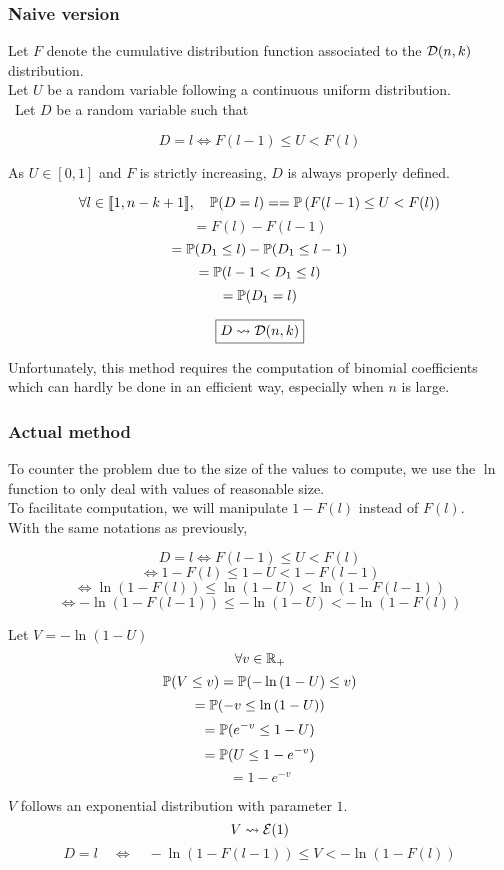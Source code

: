 	\subsubsection{Naive version}
		Let $F$ denote the cumulative distribution function associated to the $\mathcal{D}(n, k)$ distribution.\\
		Let $U$ be a random variable following a continuous uniform distribution.\\\
		Let $D$ be a random variable such that
		
		\[D = l \Leftrightarrow F(l - 1) \leq U < F(l)\]
		
		As $U\in[0, 1]$ and $F$ is strictly increasing, $D$ is always properly defined.
		
		\[\forall l\in\llbracket1, n - k + 1\rrbracket, \quad \mathbb{P}(D = l) = = \mathbb{P}\left(F(l - 1) \leq U < F(l) \right)\]
		\[ = F(l) - F(l - 1)\]
		\[ = \mathbb{P}(D_1 \leq l) - \mathbb{P}(D_1 \leq l - 1)\]
		\[ = \mathbb{P}(l - 1 < D_1 \leq l)\]
		\[ = \mathbb{P}(D_1 = l)\]
		
		\[\boxed{D\leadsto \mathcal{D}(n, k)}\]
		
		Unfortunately, this method requires the computation of binomial coefficients which can hardly be done in an efficient way, especially when $n$ is large.
		
	\subsubsection{Actual method}
		To counter the problem due to the size of the values to compute, we use the $\ln$ function to only deal with values of reasonable size.\\
		To facilitate computation, we will manipulate $1 - F(l)$ instead of $F(l)$.\\
		With the same notations as previously,
		
		\[D = l \Leftrightarrow F(l - 1) \leq U < F(l)\]
		\[\Leftrightarrow 1 - F(l)\leq 1 - U <  1 - F(l - 1)\]
		\[\Leftrightarrow \ln\left(1 - F(l)\right)\leq \ln\left(1 - U\right) <  \ln\left(1 - F(l - 1)\right)\]
		\[\Leftrightarrow -\ln\left(1 - F(l - 1)\right)\leq -\ln\left(1 - U\right) < -\ln\left(1 - F(l)\right) \]
		\[\]
		
		
		Let $V = -\ln\left(1 - U\right)$\\
		\[\forall v\in\mathbb{R}_+\]
		\[\mathbb{P}(V\leq v) = \mathbb{P}(-\ln\left(1 - U\right)\leq v)\]
		\[= \mathbb{P}(-v\leq \ln\left(1 - U\right))\]
		\[= \mathbb{P}(e^{-v} \leq 1 - U)\]
		\[= \mathbb{P}(U \leq 1 - e^{-v})\]
		\[= 1 - e^{-v}\]
		
		$V$ follows an exponential distribution with parameter $1$.
		\[V\leadsto\mathcal{E}(1)\]
		\[\boxed{D = l \quad \Leftrightarrow \quad -\ln\left(1 - F(l - 1)\right)\leq V < -\ln\left(1 - F(l)\right)}\]
		
